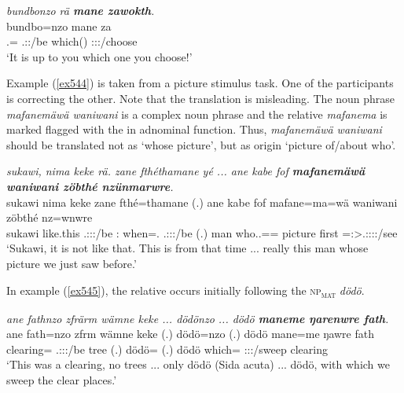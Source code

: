 \begin{exe}
	\ex \emph{bundbonzo rä \textbf{mane zawokth}.}\\
	\gll bundbo=nzo  mane za\\
	\Ssg.\All=\Only{} \Tsg.\F:\Nonpast:\Ipfv/be which(\Abs) \Ssg:\Sbj:\Imp:\Pfv/choose\\
	\trans `It is up to you which one you choose!'
	\label{ex546}
\end{exe}

Example (\ref{ex544}) is taken from a picture stimulus task. One of the participants is correcting the other. Note that the  translation is misleading. The noun phrase \emph{mafanemäwä waniwani} is a complex noun phrase and the relative  \emph{mafanema} is marked flagged with the   in adnominal function. Thus, \emph{mafanemäwä waniwani} should be translated not as  `whose picture', but as origin `picture of/about who'.

\begin{exe}
	\ex \emph{sukawi, nima keke rä. zane fthéthamane yé ... ane kabe fof \textbf{mafanemäwä waniwani zöbthé nzünmarwre}.}\\
	\gll sukawi nima keke  zane fthé=thamane  (.) ane kabe fof mafane=ma=wä waniwani zöbthé nz=wnwre\\
	sukawi {like.this} \Neg{} \Tsg.\F:\Sbj:\Nonpast:\Ipfv/be \Dem:\Prox{} when=\Temp.\Poss{} \Tsg.\Masc:\Sbj:\Nonpast:\Ipfv/be (.) \Dem{} man \Emph{} who.\Sg.\Poss=\Char=\Emph{} picture first \Immpst=\Fpl:\Sbj>\Tsg.\F:\Obj:\Nonpast:\Ipfv:\Venit/see\\
	\trans `Sukawi, it is not like that. This is from that time ... really this man whose picture we just saw before.'
	\label{ex544}
\end{exe}

In example (\ref{ex545}), the relative  occurs initially following the \textsc{np}\textsubscript{\textsc{mat}} \emph{dödö}.

\begin{exe}
	\ex \emph{ane fathnzo zfrärm wämne keke ... dödönzo ... dödö \textbf{maneme ŋarenwre fath}.}\\
	\gll ane fath=nzo zfrm wämne keke (.) dödö=nzo (.) dödö mane=me ŋawre fath\\
	\Dem{} clearing=\Only{} \Tsg.\F:\Sbj:\Pst:\Dur/be tree \Neg{} (.) dödö=\Only{} (.) dödö which=\Ins{} \Fpl:\Sbj:\Nonpast:\Ipfv/sweep clearing\\
	\trans `This was a clearing, no trees ... only dödö (Sida acuta) ... dödö, with which we sweep the clear places.' 
	\label{ex545}
\end{exe}

